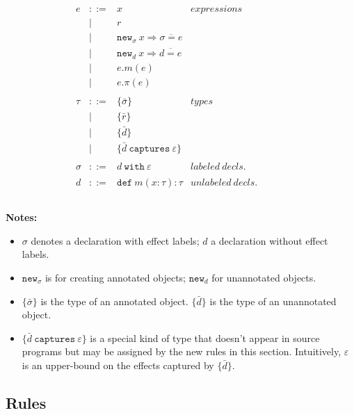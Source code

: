 \documentclass{llncs}
\newcommand{\keywadj}[1]{\mathtt{#1}}
\newcommand{\keyw}[1]{\keywadj{#1}~}
\begin{document}
\[
\begin{array}{lll}

\begin{array}{lllr}

e & ::= & x & expressions \\
  		& | & r \\
		& | & \keywadj{new}_\sigma~x \Rightarrow \overline{\sigma = e} \\
 		& | & \keywadj{new}_d~x \Rightarrow \overline{d = e} \\
 		& | & e.m(e)\\
 		& | & e.\pi(e)\\
		&&\\

\tau & ::= & \{ \bar \sigma \} & types \\
		& | & \{ \bar r \} \\
		& | & \{ \bar d \} \\
		& | & \{ \bar d ~\keyw{captures} \varepsilon \} \\
		&&\\
		
\sigma & ::= & d~\keyw{with}\varepsilon  & labeled~ decls.\\
		&&\\

d & ::= & \keyw{def} m(x:\tau):\tau & unlabeled~decls.\\
		&&\\

\end{array}
& ~~~~~~
&
\end{array}
\]

\noindent \textbf{Notes:}
\begin{itemize}
	\item $\sigma$ denotes a declaration with effect labels; $d$ a declaration without effect labels.
	\item $\keywadj{new}_\sigma$ is for creating annotated objects; $\keywadj{new}_d$ for unannotated objects.
	\item $\{ \bar \sigma \}$ is the type of an annotated object. $\{ \bar d \}$ is the type of an unannotated object.
	\item $\{ \bar d ~\keyw{captures} \varepsilon \}$ is a special kind of type that doesn't appear in source programs but may be assigned by the new rules in this section. Intuitively, $\varepsilon$ is an upper-bound on the effects captured by $\{ \bar d \}$.
\end{itemize}

\subsection{Rules}
\end{document}
